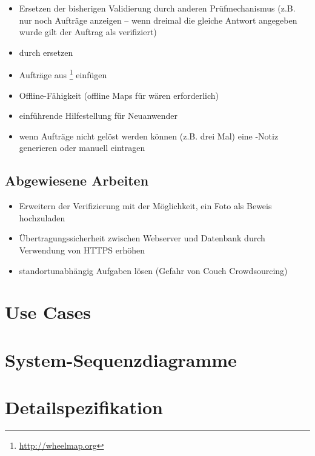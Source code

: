 \begin{itemize}
	\item Ersetzen der bisherigen Validierung durch anderen Prüfmechanismus (z.B. nur noch Aufträge anzeigen – wenn dreimal die gleiche Antwort angegeben wurde gilt der Auftrag als verifiziert)
	\item {} durch  ersetzen
	\item Aufträge aus \footnote{\url{http://wheelmap.org}}	 einfügen
	\item Offline-Fähigkeit (offline Maps für  wären erforderlich)
	\item einführende Hilfestellung für Neuanwender
	\item wenn Aufträge nicht gelöst werden können (z.B. drei Mal) eine -Notiz generieren oder manuell eintragen
\end{itemize}

\subsection{Abgewiesene Arbeiten}
\begin{itemize}
	\item Erweitern der Verifizierung mit der Möglichkeit, ein Foto als Beweis hochzuladen
	\item Übertragungssicherheit zwischen Webserver und Datenbank durch Verwendung von HTTPS erhöhen
	\item standortunabhängig Aufgaben lösen (Gefahr von Couch Crowdsourcing)
\end{itemize}


\section{Use Cases}


\section{System-Sequenzdiagramme}


\section{Detailspezifikation}

